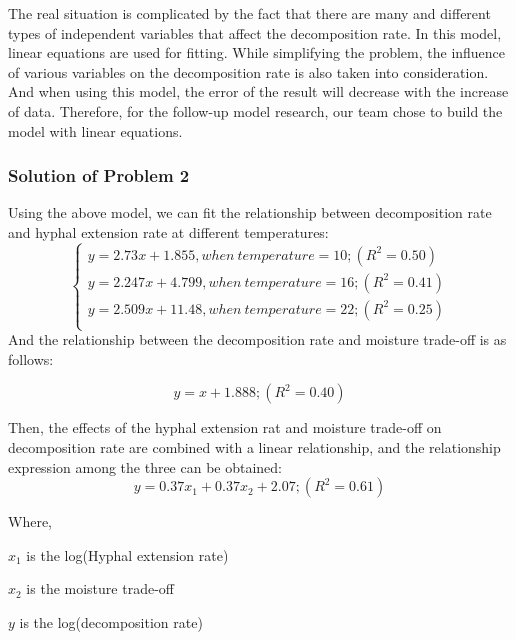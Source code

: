 The real situation is complicated by the fact that there are many and different types of independent variables that affect the decomposition rate. In this model, linear equations are used for fitting. While simplifying the problem, the influence of various variables on the decomposition rate is also taken into consideration. And when using this model, the error of the result will decrease with the increase of data. Therefore, for the follow-up model research, our team chose to build the model with linear equations.

\subsubsection{Solution of Problem 2}

Using the above model, we can fit the relationship between decomposition rate and hyphal extension rate at different temperatures:
\begin{equation}\label{}
\left\{
\begin{array}{l}
    y=2.73x+1.855, when\ temperature = 10; (R^2=0.50)\\
    y=2.247x+4.799, when\ temperature = 16; (R^2=0.41) \\
    y=2.509x+11.48, when\ temperature = 22; (R^2=0.25) \\
\end{array}
\right.
\end{equation}
And the relationship between the decomposition rate and moisture trade-off is as follows:

\begin{equation}\label{}
    y=x+1.888; (R^2=0.40)
\end{equation}

Then, the effects of the hyphal extension rat and moisture trade-off on decomposition rate are combined with a linear relationship, and the relationship expression among the three can be obtained:
\begin{equation}\label{}
    y=0.37x_{1}+0.37x_{2}+2.07; (R^2=0.61)
\end{equation}

Where,

$x_{1}$ is the log(Hyphal extension rate)

$x_{2}$ is the moisture trade-off

$y$ is the log(decomposition rate)

